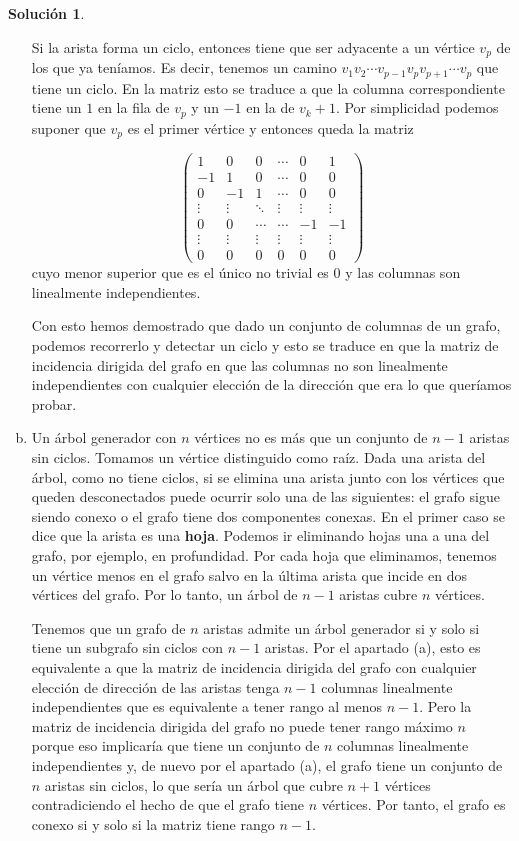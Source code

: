 \documentclass[10pt]{article}
\theoremstyle{definition}
\newtheorem*{sol}{Solución}
\begin{document}
\begin{sol}
\begin{enumerate}[(a)]
Si la arista forma un ciclo, entonces tiene que ser adyacente a un vértice $v_p$ de los que ya teníamos. Es decir, tenemos un camino $v_1v_2\cdots v_{p-1} v_pv_{p+1}\cdots v_p$ que tiene un ciclo. En la matriz esto se traduce a que la columna correspondiente tiene un $1$ en la fila de $v_p$ y un $-1$ en la de $v_k+1$. Por simplicidad podemos suponer que $v_p$ es el primer vértice y entonces queda la matriz

$$\begin{pmatrix}
1 & 0 & 0 & \cdots & 0 & 1\\
-1 & 1 & 0 & \cdots & 0 & 0\\
0 & -1 & 1 & \cdots & 0 & 0\\
\vdots & \vdots & \ddots & \vdots & \vdots & \vdots\\
0 & 0 & \cdots & \cdots & -1 & -1\\
\vdots & \vdots & \vdots & \vdots & \vdots & \vdots \\
0 & 0 & 0 & 0 & 0 & 0

\end{pmatrix}$$
cuyo menor superior que es el único no trivial es $0$ y las columnas son linealmente independientes.

Con esto hemos demostrado que dado un conjunto de columnas de un grafo, podemos recorrerlo y detectar un ciclo y esto se traduce en que la matriz de incidencia dirigida del grafo en que las columnas no son linealmente independientes con cualquier elección de la dirección que era lo que queríamos probar.

\item  Un árbol generador con $n$ vértices no es más que un conjunto de $n-1$ aristas sin ciclos. Tomamos un vértice distinguido como raíz. Dada una arista del árbol, como no tiene ciclos, si se elimina una arista junto con los vértices que queden desconectados puede ocurrir solo una de las siguientes: el grafo sigue siendo conexo o el grafo tiene dos componentes conexas. En el primer caso se dice que la arista es una \textbf{hoja}. Podemos ir eliminando hojas una a una del grafo, por ejemplo, en profundidad. Por cada hoja que eliminamos, tenemos un vértice menos en el grafo salvo en la última arista que incide en dos vértices del grafo. Por lo tanto, un árbol de $n-1$ aristas cubre $n$ vértices.

Tenemos que un grafo de $n$ aristas admite un árbol generador si y solo si tiene un subgrafo sin ciclos con $n-1$ aristas. Por el apartado (a), esto es equivalente a que la matriz de incidencia dirigida del grafo con cualquier elección de dirección de las aristas tenga $n-1$ columnas linealmente independientes que es equivalente a tener rango al menos $n-1$. Pero la matriz de incidencia dirigida del grafo no puede tener rango máximo $n$ porque eso implicaría que tiene un conjunto de $n$ columnas linealmente independientes y, de nuevo por el apartado (a), el grafo tiene un conjunto de $n$ aristas sin ciclos, lo que sería un árbol que cubre $n+1$ vértices contradiciendo el hecho de que el grafo tiene $n$ vértices. Por tanto, el grafo es conexo si y solo si la matriz tiene rango $n-1$.
\end{enumerate}
\end{sol}
\end{document}
